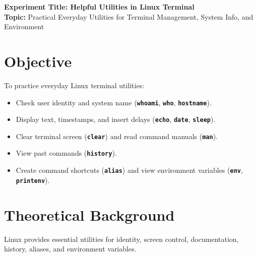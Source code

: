 \documentclass[10pt,a4paper]{article}
\newcommand{\cmd}[1]{\texttt{\textbf{#1}}}
\begin{document}
\raggedbottom
\thispagestyle{firstpage}

\begin{center}
  {\Large\bfseries\sffamily\color{primary} Experiment Title: Helpful Utilities in Linux Terminal}\\[3pt]
  {\normalsize\sffamily\textbf{Topic:} Practical Everyday Utilities for Terminal Management, System Info, and Environment}
\end{center}
\vspace{-4pt}

\section{Objective}
To practice everyday Linux terminal utilities:
\begin{itemize}[noitemsep,topsep=1pt,leftmargin=1.2em]
  \item Check user identity and system name (\cmd{whoami}, \cmd{who}, \cmd{hostname}).
  \item Display text, timestamps, and insert delays (\cmd{echo}, \cmd{date}, \cmd{sleep}).
  \item Clear terminal screen (\cmd{clear}) and read command manuals (\cmd{man}).
  \item View past commands (\cmd{history}).
  \item Create command shortcuts (\cmd{alias}) and view environment variables (\cmd{env}, \cmd{printenv}).
\end{itemize}

\section{Theoretical Background}
Linux provides essential utilities for identity, screen control, documentation, history, aliases, and environment variables.
\end{document}
